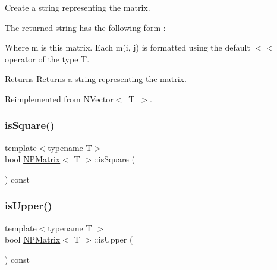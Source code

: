 Create a string representing the matrix. 

The returned string has the following form \+:


\begin{DoxyCode}{0}
\end{DoxyCode}
 Where {\ttfamily m} is {\ttfamily this} matrix. Each {\ttfamily m(i, j)} is formatted using the default {\ttfamily $<$$<$} operator of the type {\ttfamily T}.

\begin{DoxyReturn}{Returns}
Returns a string representing the matrix. 
\end{DoxyReturn}


Reimplemented from \mbox{\hyperlink{class_n_vector_a6d66b06b953197c1b3965ed69f9fd17e}{N\+Vector$<$ T $>$}}.

\mbox{\label{class_n_p_matrix_af4d13e966823c2e132461df6b1ed7602}} 
\subsubsection{\texorpdfstring{isSquare()}{isSquare()}}
{\footnotesize\ttfamily template$<$typename T$>$ \\
bool \mbox{\hyperlink{class_n_p_matrix}{N\+P\+Matrix}}$<$ T $>$\+::is\+Square (\begin{DoxyParamCaption}{ }\end{DoxyParamCaption}) const\hspace{0.3cm}{\ttfamily [inline]}}

\mbox{\label{class_n_p_matrix_aa1baeec21546add3c67f0d330c9d0016}} 
\subsubsection{\texorpdfstring{isUpper()}{isUpper()}}
{\footnotesize\ttfamily template$<$typename T $>$ \\
bool \mbox{\hyperlink{class_n_p_matrix}{N\+P\+Matrix}}$<$ T $>$\+::is\+Upper (\begin{DoxyParamCaption}{ }\end{DoxyParamCaption}) const}

